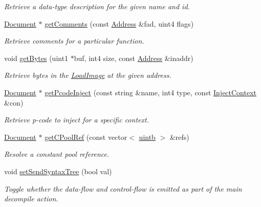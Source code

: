 \begin{DoxyCompactItemize}
\begin{DoxyCompactList}\small\item\em Retrieve a data-\/type description for the given name and id. \end{DoxyCompactList}\item 
\mbox{\hyperlink{class_document}{Document}} $\ast$ \mbox{\hyperlink{class_architecture_ghidra_adf2db85014f4129a11f6aadc3ac53776}{get\+Comments}} (const \mbox{\hyperlink{class_address}{Address}} \&fad, uint4 flags)
\begin{DoxyCompactList}\small\item\em Retrieve comments for a particular function. \end{DoxyCompactList}\item 
void \mbox{\hyperlink{class_architecture_ghidra_a466a3f9dfecdbaacfae1dd93e7d5d3a6}{get\+Bytes}} (uint1 $\ast$buf, int4 size, const \mbox{\hyperlink{class_address}{Address}} \&inaddr)
\begin{DoxyCompactList}\small\item\em Retrieve bytes in the \mbox{\hyperlink{class_load_image}{Load\+Image}} at the given address. \end{DoxyCompactList}\item 
\mbox{\hyperlink{class_document}{Document}} $\ast$ \mbox{\hyperlink{class_architecture_ghidra_a68392af0ec054e9c2a3d2f4774bfce28}{get\+Pcode\+Inject}} (const string \&name, int4 type, const \mbox{\hyperlink{class_inject_context}{Inject\+Context}} \&con)
\begin{DoxyCompactList}\small\item\em Retrieve p-\/code to inject for a specific context. \end{DoxyCompactList}\item 
\mbox{\hyperlink{class_document}{Document}} $\ast$ \mbox{\hyperlink{class_architecture_ghidra_a3806ce145501bdeb8dc6d60bad920d24}{get\+C\+Pool\+Ref}} (const vector$<$ \mbox{\hyperlink{types_8h_a2db313c5d32a12b01d26ac9b3bca178f}{uintb}} $>$ \&refs)
\begin{DoxyCompactList}\small\item\em Resolve a constant pool reference. \end{DoxyCompactList}\item 
void \mbox{\hyperlink{class_architecture_ghidra_a26c9c47c970ba0b6f1dedaf23f638eb2}{set\+Send\+Syntax\+Tree}} (bool val)
\begin{DoxyCompactList}\small\item\em Toggle whether the data-\/flow and control-\/flow is emitted as part of the main decompile action. \end{DoxyCompactList}\item 

\end{DoxyCompactItemize}
